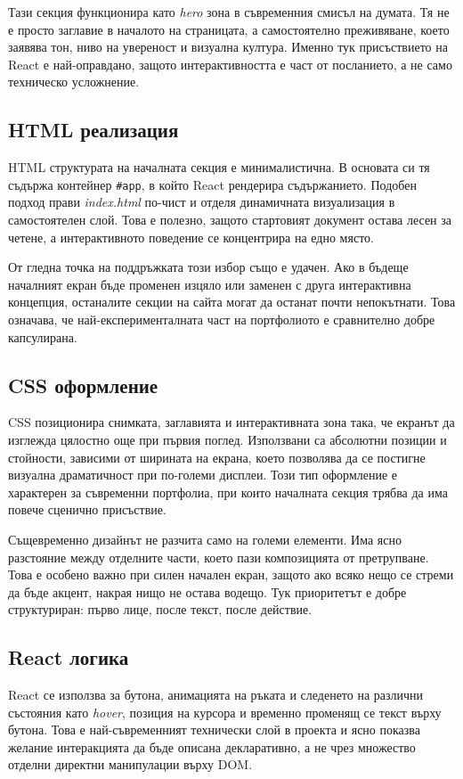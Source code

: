 \documentclass[11pt,a4paper]{article}
\begin{document}
Тази секция функционира като \textit{hero} зона в съвременния смисъл на думата. Тя не е просто заглавие в началото на страницата, а самостоятелно преживяване, което заявява тон, ниво на увереност и визуална култура. Именно тук присъствието на React е най-оправдано, защото интерактивността е част от посланието, а не само техническо усложнение.

\subsection{HTML реализация}
HTML структурата на началната секция е минималистична. В основата си тя съдържа контейнер \texttt{\#app}, в който React рендерира съдържанието. Подобен подход прави \textit{index.html} по-чист и отделя динамичната визуализация в самостоятелен слой. Това е полезно, защото стартовият документ остава лесен за четене, а интерактивното поведение се концентрира на едно място.

От гледна точка на поддръжката този избор също е удачен. Ако в бъдеще началният екран бъде променен изцяло или заменен с друга интерактивна концепция, останалите секции на сайта могат да останат почти непокътнати. Това означава, че най-експерименталната част на портфолиото е сравнително добре капсулирана.

\subsection{CSS оформление}
CSS позиционира снимката, заглавията и интерактивната зона така, че екранът да изглежда цялостно още при първия поглед. Използвани са абсолютни позиции и стойности, зависими от ширината на екрана, което позволява да се постигне визуална драматичност при по-големи дисплеи. Този тип оформление е характерен за съвременни портфолиа, при които началната секция трябва да има повече сценично присъствие.

Същевременно дизайнът не разчита само на големи елементи. Има ясно разстояние между отделните части, което пази композицията от претрупване. Това е особено важно при силен начален екран, защото ако всяко нещо се стреми да бъде акцент, накрая нищо не остава водещо. Тук приоритетът е добре структуриран: първо лице, после текст, после действие.

\subsection{React логика}
React се използва за бутона, анимацията на ръката и следенето на различни състояния като \textit{hover}, позиция на курсора и временно променящ се текст върху бутона. Това е най-съвременният технически слой в проекта и ясно показва желание интеракцията да бъде описана декларативно, а не чрез множество отделни директни манипулации върху DOM.
\end{document}
